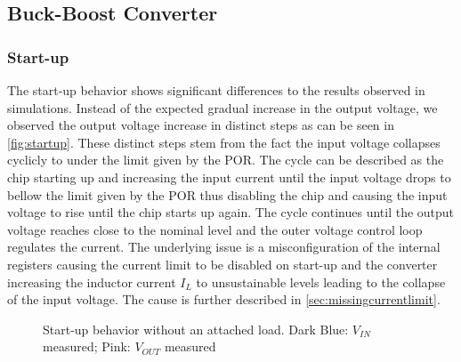 \clearpage


\subsection{Buck-Boost Converter}

\subsubsection{Start-up}
\label{sec:startup}
The start-up behavior shows significant differences to the results observed in simulations. Instead of the expected gradual increase in the output voltage, we observed the output voltage increase in distinct steps as can be seen in \autoref{fig:startup}. These distinct steps stem from the fact the input voltage collapses cyclicly to under the limit given by the \ac{POR}. The cycle can be described as the chip starting up and increasing the input current until the input voltage drops to bellow the limit given by the \ac{POR} thus disabling the chip and causing the input voltage to rise until the chip starts up again. The cycle continues until the output voltage reaches close to the nominal level and the outer voltage control loop regulates the current.  
The underlying issue is a misconfiguration of the internal registers causing the current limit to be disabled on start-up and the converter increasing the inductor current $I_L$ to unsustainable levels leading to the collapse of the input voltage. The cause is further described in \autoref{sec:missingcurrentlimit}.

\begin{figure}[ht]
	\centering
	
	\caption{Start-up behavior without an attached load. Dark Blue: $V_{IN}$ measured; Pink: $V_{OUT}$ measured}
	\label{fig:startup}
\end{figure}
\clearpage


